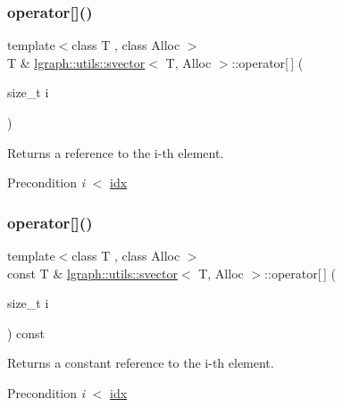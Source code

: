 \subsubsection{\texorpdfstring{operator[]()}{operator[]()}\hspace{0.1cm}{\footnotesize\ttfamily [1/2]}}
{\footnotesize\ttfamily template$<$class T , class Alloc $>$ \\
T \& \hyperlink{classlgraph_1_1utils_1_1svector}{lgraph\+::utils\+::svector}$<$ T, Alloc $>$\+::operator\mbox{[}$\,$\mbox{]} (\begin{DoxyParamCaption}\item[{size\+\_\+t}]{i }\end{DoxyParamCaption})}



Returns a reference to the i-\/th element. 

\begin{DoxyPrecond}{Precondition}
{\itshape i} $<$ \hyperlink{classlgraph_1_1utils_1_1svector_a7ef963c079c7dc8a6a559ceef81a241f}{idx} 
\end{DoxyPrecond}
\mbox{\label{classlgraph_1_1utils_1_1svector_a364404eb0b1cb3407cdab853256847d3}} 
\subsubsection{\texorpdfstring{operator[]()}{operator[]()}\hspace{0.1cm}{\footnotesize\ttfamily [2/2]}}
{\footnotesize\ttfamily template$<$class T , class Alloc $>$ \\
const T \& \hyperlink{classlgraph_1_1utils_1_1svector}{lgraph\+::utils\+::svector}$<$ T, Alloc $>$\+::operator\mbox{[}$\,$\mbox{]} (\begin{DoxyParamCaption}\item[{size\+\_\+t}]{i }\end{DoxyParamCaption}) const}



Returns a constant reference to the i-\/th element. 

\begin{DoxyPrecond}{Precondition}
{\itshape i} $<$ \hyperlink{classlgraph_1_1utils_1_1svector_a7ef963c079c7dc8a6a559ceef81a241f}{idx} 
\end{DoxyPrecond}
\mbox{\label{classlgraph_1_1utils_1_1svector_a3d1e4cc50553983c7e791779fee9b2fe}} 
